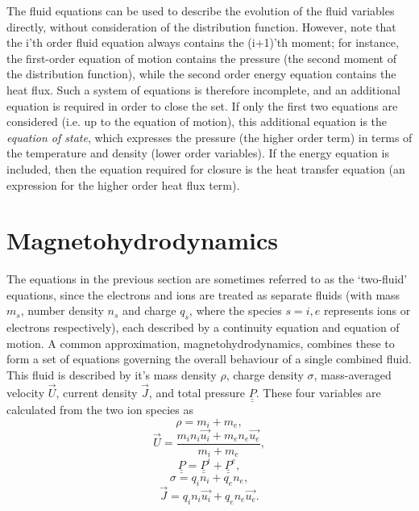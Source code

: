 The fluid equations can be used to describe the evolution of the fluid variables directly, without consideration of the distribution function. However, note that the i'th order fluid equation always contains the (i+1)'th moment; for instance, the first-order equation of motion contains the pressure (the second moment of the distribution function), while the second order energy equation contains the heat flux. Such a system of equations is therefore incomplete, and an additional equation is required in order to close the set. If only the first two equations are considered (i.e. up to the equation of motion), this additional equation is the \textit{equation of state}, which expresses the pressure (the higher order term) in terms of the temperature and density (lower order variables). If the energy equation is included, then the equation required for closure is the heat transfer equation (an expression for the higher order heat flux term).

\section{Magnetohydrodynamics}
The equations in the previous section are sometimes referred to as the `two-fluid' equations, since the electrons and ions are treated as separate fluids (with mass $m_s$, number density $n_s$ and charge $q_s$, where the species $s = i,e$ represents ions or electrons respectively), each described by a continuity equation and equation of motion. A common approximation, magnetohydrodynamics, combines these to form a set of equations governing the overall behaviour of a single combined fluid. This fluid is described by it's mass density $\rho$, charge density $\sigma$, mass-averaged velocity $\vec{U}$, current density $\vec{J}$, and total pressure $\underline{\underline{P}}$. These four variables are calculated from the two ion species as
\begin{equation} \rho = m_i + m_e,  \end{equation}
\begin{equation} \vec{U} = \frac{m_i n_i \vec{u_i} + m_e n_e \vec{u_e}}{ m_i + m_e},  \end{equation}
\begin{equation} \underline{\underline{P}} = \underline{\underline{P}}^i + \underline{\underline{P}}^e,  \end{equation}
\begin{equation} \sigma = q_i n_i + q_e n_e,  \end{equation}
\begin{equation} \vec{J} = q_i n_i \vec{u_i} + q_e n_e \vec{u_e}.  \end{equation}

